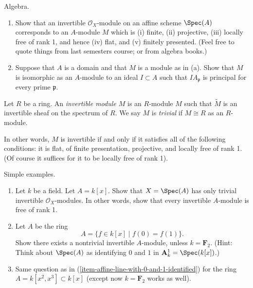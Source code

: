\begin{exercise}
\label{exercise-invertible-algebra}
Algebra.
\begin{enumerate}
\item Show that an invertible ${\mathcal O}_X$-module on
an affine scheme $\Spec(A)$ corresponds to an $A$-module $M$ which is
(i) finite, (ii) projective, (iii) locally free of rank 1,
and hence (iv) flat, and (v) finitely presented. (Feel free to
quote things from last semesters course; or from algebra books.)
\item Suppose that $A$ is a domain and that $M$ is
a module as in (a). Show that $M$ is isomorphic as an $A$-module
to an ideal $I \subset A$ such that $IA_{\mathfrak p}$ is principal for
every prime ${\mathfrak p}$.
\end{enumerate}
\end{exercise}

\begin{definition}
\label{definition-invertible-module}
Let $R$ be a ring. An {\it invertible module $M$} is an $R$-module
$M$ such that $\widetilde M$ is an invertible sheaf on the
spectrum of $R$. We say $M$ is {\it trivial} if $M \cong R$ as
an $R$-module.
\end{definition}

\noindent
In other words, $M$ is invertible if and only if
it satisfies all of the following conditions:
it is flat, of finite presentation, projective, and
locally free of rank 1. (Of course it suffices for it
to be locally free of rank 1).

\begin{exercise}
\label{exercise-simple-examples-invertible}
Simple examples.
\begin{enumerate}
\item
\label{item-affine-line}
Let $k$ be a field. Let $A = k[x]$.
Show that $X = \Spec(A)$ has only trivial invertible
${\mathcal O}_X$-modules. In other words, show that every
invertible $A$-module is free of rank 1.
\item
\label{item-affine-line-with-0-and-1-identified}
Let $A$ be the ring
$$
A = \{ f\in k[x] \mid f(0) = f(1) \}.
$$
Show there exists a nontrivial invertible $A$-module, unless
$k = {\mathbf F}_2$. (Hint: Think about $\Spec(A)$ as identifying
$0$ and $1$ in ${\mathbf A}^1_k = \Spec(k[x])$.)
\item
\label{item-affine-line-with-cusp}
Same question as in (\ref{item-affine-line-with-0-and-1-identified})
for the ring $A = k[x^2, x^3] \subset k[x]$
(except now $k = {\mathbf F}_2$ works as well).
\end{enumerate}
\end{exercise}

